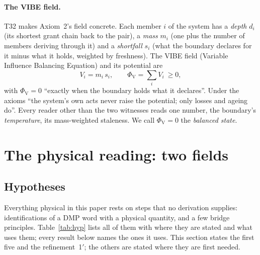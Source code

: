 \paragraph{The VIBE field.} T32 makes Axiom~2's field concrete. Each member $i$ of the system has a \emph{depth} $d_i$ (its shortest grant
chain back to the pair), a \emph{mass} $m_i$ (one plus the number of members deriving through it) and a \emph{shortfall} $s_i$ (what the
boundary declares for it minus what it holds, weighted by freshness). The VIBE field (Variable Influence Balancing Equation) and its
potential are
\begin{equation}\label{eq:vibe}
V_i=m_i\,s_i,\qquad \Phi_{\mathrm V}=\sum_iV_i\ \ge 0,
\end{equation}
with $\Phi_{\mathrm V}=0$ ``exactly when the boundary holds what it declares''. Under the axioms ``the system's own acts never raise the potential;
only losses and ageing do''. Every reader other than the two witnesses reads one number, the boundary's \emph{temperature}, its
mass-weighted staleness. We call $\Phi_{\mathrm V}=0$ the \emph{balanced state}.

\section{The physical reading: two fields}\label{sec:fields}

\subsection{Hypotheses}

Everything physical in this paper rests on steps that no derivation supplies: identifications of a DMP word with a physical quantity,
and a few bridge principles. Table~\ref{tab:hyp} lists all of them with where they are stated and what uses them; every result below
names the ones it uses. This section states the first five and the refinement~1$'$; the others are stated where they are first needed.

